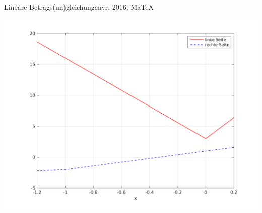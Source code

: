 \begin{MAufgabe}{Lineare Betrags(un)gleichungen}{vr, 2016, MaTeX}
 \begin{center}
 \includegraphics[width=0.8\linewidth]{Abb_zur_Ag_autogenerated_abs_8.png} \end{center}
 
\else\relax\fi
 \end{MAufgabe}
